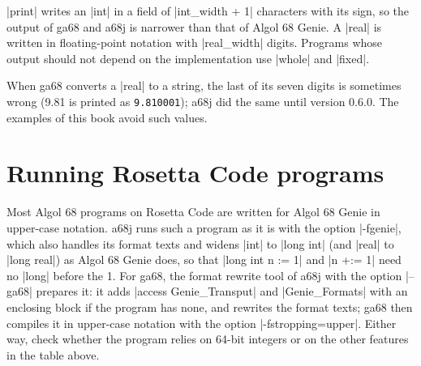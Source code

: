\code|print| writes an \code|int| in a field of \code|int_width + 1|
characters with its sign, so the output of ga68 and a68j is narrower than
that of Algol 68 Genie. A \code|real| is written in floating-point
notation with \code|real_width| digits. Programs whose output should not
depend on the implementation use \code|whole| and \code|fixed|.

When ga68 converts a \code|real| to a string, the last of its seven
digits is sometimes wrong (9.81 is printed as \texttt{9.810001}); a68j
did the same until version 0.6.0. The examples of this book avoid such
values.

\section*{Running Rosetta Code programs}

Most Algol 68 programs on Rosetta Code are written for Algol 68 Genie in
upper-case notation. a68j runs such a program as it is with the option
\code|-fgenie|, which also handles its format texts and widens
\code|int| to \code|long int| (and \code|real| to \code|long real|) as
Algol 68 Genie does, so that \code|long int n := 1| and \code|n +:= 1|
need no \code|long| before the 1. For ga68, the
format rewrite tool of a68j with the option \code|--ga68| prepares it:
it adds \code|access Genie_Transput| and \code|Genie_Formats| with an
enclosing block if the program has none, and rewrites the format texts;
ga68 then compiles it in upper-case notation with the option
\code|-fstropping=upper|. Either way, check whether the
program relies on 64-bit integers or on the other features in the table
above.
